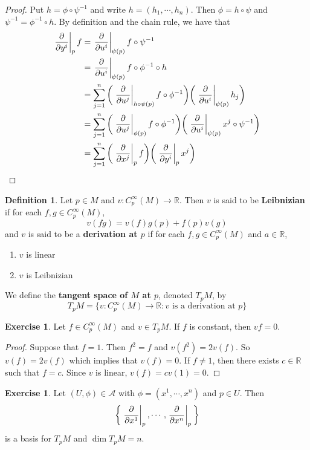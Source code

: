 \documentclass[12pt]{amsart}
\theoremstyle{definition}
\newtheorem{defn}[definition]{Definition}
\newtheorem{ex}[definition]{Exercise}
\newcommand{\R}{\mathbb{R}}
\newcommand{\MA}{\mathcal{A}}
\begin{document}
	\begin{proof}
		Put $h = \phi \circ \psi^{-1}$ and write $h = (h_1, \cdots, h_n)$. Then $\phi = h \circ \psi$ and $\psi^{-1} = \phi^{-1} \circ h$. By definition and the chain rule, we have that 
		\begin{align*}
		\eval{\pdv{y^i}}_{p} f 
			&= \eval{\pdv{u^i}}_{\psi(p)} f \circ \psi^{-1} \\
			&= \eval{\pdv{u^i}}_{\psi(p)} f \circ \phi^{-1} \circ h \\
			&= \sum_{j=1}^n \bigg( \eval{\pdv{u^j}}_{h \circ \psi (p)} f \circ \phi^{-1} \bigg)  \bigg( \eval{\pdv{u^i}}_{\psi(p)} h_j \bigg) \\
			&= \sum_{j=1}^n \bigg( \eval{\pdv{u^j}}_{\phi (p)} f \circ \phi^{-1}  \bigg) \bigg( \eval{\pdv{u^i}}_{\psi(p)} x^j \circ \psi^{-1} \bigg) \\
			&= \sum_{j=1}^n \bigg( \eval{\pdv{x^j}}_{p} f \bigg)  \bigg(   \eval{\pdv{y^i}}_{p} x^j  \bigg)\\
		\end{align*}
	\end{proof}

	\begin{defn}
		Let $p \in M$ and $v: C^{\infty}_p(M) \rightarrow \R$. Then $v$ is said to be \textbf{Leibnizian} if for each $f,g \in  C^{\infty}_p(M)$, $$v(fg) = v(f)g(p) + f(p)v(g)$$ and $v$ is said to be a \textbf{derivation at $p$} if for each $f, g \in C^{\infty}_p(M)$ and $a \in \R$,
		\begin{enumerate}
			\item $v$ is linear 
			\item $v$ is Leibnizian
		\end{enumerate}
		We define the \textbf{tangent space of $M$ at $p$}, denoted $T_pM$, by $$T_pM = \{ v: C^{\infty}_p(M) \rightarrow \R: v \text{ is a derivation at }p\}$$
	\end{defn}

	\begin{ex}
		Let $f \in C^{\infty}_p(M)$ and $v \in T_pM$. If $f$ is constant, then $vf = 0$.
	\end{ex}

	\begin{proof}
		Suppose that $f = 1$. Then $f^2 = f$ and $v(f^2) = 2v(f)$. So $v(f) = 2v(f)$ which implies that $v(f) = 0$. If $f \neq 1$, then there exists $c \in \R$ such that $f = c$. Since $v$ is linear, $v(f) = cv(1) = 0$.
	\end{proof}

	\begin{ex}
		Let $(U, \phi) \in \MA$ with $\phi = (x^1, \cdots, x^n)$ and $p \in U$. Then $$ \bigg \{\eval{\pdv{x^1}}_{p}, \cdots, \eval{\pdv{x^n}}_{p} \bigg \}$$ is a basis for $T_pM$ and $\dim T_pM = n$.
	\end{ex}
\end{document}
